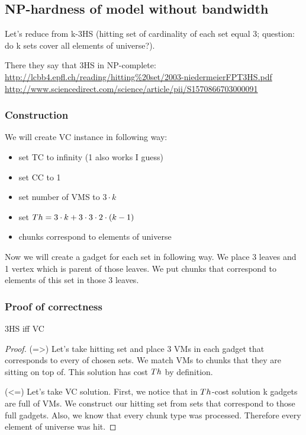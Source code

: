 \subsection{NP-hardness of model without bandwidth}
Let's reduce from k-3HS (hitting set of cardinality of each set equal
3; question: do k sets cover all elements of universe?).

There they say that 3HS in NP-complete:
\url{http://lcbb4.epfl.ch/reading/hitting\%20set/2003-niedermeierFPT3HS.pdf}
\url{http://www.sciencedirect.com/science/article/pii/S1570866703000091}


\subsubsection{Construction}

We will create VC instance in following way:
\begin{itemize}
\item set TC to infinity (1 also works I guess)
\item set CC to 1
\item set number of VMS to $3 \cdot k$
\item set $Th =  3 \cdot k + 3 \cdot 3 \cdot 2 \cdot (k - 1)$
\item chunks correspond to elements of universe
\end{itemize}

Now we will create a gadget for each set in following way. We place 3
leaves and 1 vertex which is parent of those leaves. We put chunks
that correspond to elements of this set in those 3 leaves.

\subsubsection{Proof of correctness}
\begin{theorem}
3HS iff VC
\end{theorem}
\begin{proof}

(=>) Let's take hitting set and place 3 VMs in each gadget that
corresponds to every of chosen sets. We match VMs to chunks that they
are sitting on top of. This solution has cost $Th$ by definition.

(<=) Let's take VC solution. First, we notice that in $Th$-cost
solution k gadgets are full of VMs. We construct our hitting set from
sets that correspond to those full gadgets. Also, we know that every
chunk type was processed. Therefore every element of universe was hit.
\end{proof}